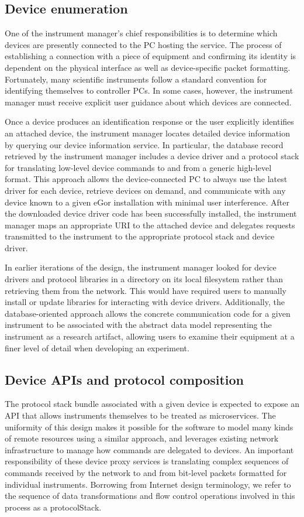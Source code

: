\documentclass[../thesis]{subfiles}
\begin{document}
\subsection{Device enumeration}
One of the instrument manager's chief responsibilities is to determine
which devices are presently connected to the PC hosting the
service. The process of establishing a connection with a piece of
equipment and confirming its identity is dependent on the physical
interface as well as device-specific packet formatting. Fortunately,
many scientific instruments follow a standard convention for
identifying themselves to controller PCs. In some cases, however, the
instrument manager must receive explicit user guidance about which
devices are connected.

Once a device produces an identification response or the user
explicitly identifies an attached device, the instrument manager
locates detailed device information by querying our device information
service. In particular, the database record retrieved by the
instrument manager includes a device driver and a protocol stack for
translating low-level device commands to and from a generic high-level
format. This approach allows the device-connected PC to always use the
latest driver for each device, retrieve devices on demand, and
communicate with any device known to a given eGor installation with
minimal user interference. After the downloaded device driver code has
been successfully installed, the instrument manager maps an
appropriate \gls{URI} to the attached device and delegates requests
transmitted to the instrument to the appropriate protocol stack and
device driver.

In earlier iterations of the design, the instrument manager looked for
device drivers and protocol libraries in a directory on its local
filesystem rather than retrieving them from the network. This would
have required users to manually install or update libraries for
interacting with device drivers. Additionally, the database-oriented
approach allows the concrete communication code for a given instrument
to be associated with the abstract data model representing the
instrument as a research artifact, allowing users to examine their
equipment at a finer level of detail when developing an experiment.

\subsection{Device APIs and protocol composition}
The protocol stack bundle associated with a given device is expected
to expose an \gls{API} that allows instruments themselves to be
treated as microservices. The uniformity of this design makes it
possible for the software to model many kinds of remote resources
using a similar approach, and leverages existing network
infrastructure to manage how commands are delegated to devices. An
important responsibility of these device proxy services is translating
complex sequences of commands received by the network to and from
bit-level packets formatted for individual instruments. Borrowing from
Internet design terminology, we refer to the sequence of data
transformations and flow control operations involved in this process
as a \gls{protocolStack}.
\end{document}
